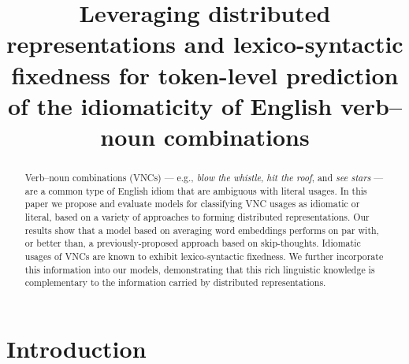 \documentclass[11pt,a4paper]{article}
\title{Leveraging distributed representations and lexico-syntactic
  fixedness for token-level prediction of the idiomaticity of English
  verb--noun combinations}
\date{}
\begin{document}
\maketitle

\begin{abstract}
Verb--noun combinations (VNCs) --- e.g., \emph{blow the whistle},
\emph{hit the roof}, and \emph{see stars} --- are a common type of
English idiom that are ambiguous with literal usages. In this paper we
propose and evaluate models for classifying VNC usages as idiomatic or
literal, based on a variety of approaches to forming distributed
representations. Our results show that a model
based on averaging word embeddings performs on par with, or better
than,
a previously-proposed approach based on skip-thoughts. Idiomatic
usages of VNCs are known to exhibit lexico-syntactic fixedness. We
further incorporate this information into our models, demonstrating
that this rich linguistic knowledge is complementary to the
information carried by distributed representations.






\end{abstract}

\section{Introduction}



\end{document}
